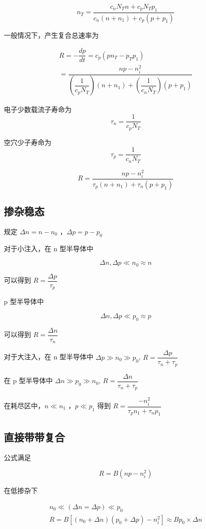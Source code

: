 \documentclass[cn,11pt,chinese,black,simple]{../elegantbook}
\begin{document}
\[n_{ T }=\dfrac{c_{ n } N_{ T } n+c_{ p } N_{ T } p_{1}}{c_{ n }\left(n+n_{1}\right)+c_{ p }\left(p+p_{1}\right)}\]

一般情况下，产生复合总速率为

\[\begin{array}{l}
    R=-\dfrac{d p}{d t}=c_{p}\left(p n_{T}-p_{T} p_{1}\right) \\
    =\dfrac{n p-n_{i}^{2}}{\left(\dfrac{1}{c_{p} N_{T}}\right)\left(n+n_{1}\right)+\left(\dfrac{1}{c_{n} N_{T}}\right)\left(p+p_{1}\right)}
\end{array}\]

电子少数载流子寿命为 \[\tau_n = \dfrac{1}{c_p N_T}\]

空穴少子寿命为 \[\tau_p = \dfrac{1}{c_n N_T}\]

\[R=\dfrac{n p-n_{i}^{2}}{\tau_{p}\left(n+n_{1}\right)+\tau_{n}\left(p+p_{1}\right)}\]

\subsection{掺杂稳态}

规定 \(\Delta n = n - n_0\) ，\(\Delta p = p - p_0\)

对于小注入，在 n 型半导体中 

\[
\Delta n, \Delta p \ll n_0 \approx n     
\]

可以得到 \(R = \dfrac{\Delta p}{\tau_p}\)

p 型半导体中 


\[
\Delta n, \Delta p \ll p_0 \approx p
\]

可以得到 \(R = \dfrac{\Delta n}{\tau_n}\)

对于大注入，在 n 型半导体中 \(\Delta p \gg n_0 \gg p_0\), \(R = \dfrac{\Delta p}{\tau_n + \tau_p}\)


在 p 型半导体中 \(\Delta n \gg p_0 \gg n_0\), \(R = \dfrac{\Delta n}{\tau_n + \tau_p}\)

在耗尽区中，\(n \ll n_1\) ，\(p \ll p_1\) 得到 \(R = \dfrac{-n_i^2}{\tau_p n_1 + \tau_n p_1}\)

\subsection{直接带带复合} 

公式满足

\[R = B(np - n_i^2)\]

在低掺杂下

\[\begin{array}{l}
    n_{0} \ll(\Delta n=\Delta p) \ll p_{0} \\
    R=B\left[\left(n_{0}+\Delta n\right)\left(p_{0}+\Delta p\right)-n_{i}^{2}\right] \approx B p_{0} \times \Delta n
\end{array}\]
\end{document}
